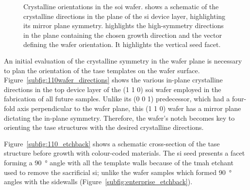 \begin{figure}
{
    }
    \caption[Crystalline orientations in the \hkl(1 1 0) \acs{soi} wafer.] {Crystalline orientations in the \hkl[1 1 0] \acs{soi} wafer.  shows a schematic of the crystalline directions in the plane of the \acs{si} device layer, highlighting its mirror plane symmetry.  highlights the high-symmetry directions in the  plane containing the chosen  growth direction and the \hkl[1 1 0] vector defining the wafer orientation. It highlights the vertical  seed facet.}
    \label{fig:110_wafer_properties}
\end{figure}

An initial evaluation of the crystalline symmetry in the wafer plane is necessary to plan the orientation of the \acs{tase} templates on the wafer surface. Figure~\ref{subfig:110wafer_directions} shows the various in-plane crystalline directions in the top device layer of the \hkl(1 1 0) \acs{soi} wafer employed in the fabrication of all future samples. Unlike its \hkl(0 0 1) predecessor, which had a four-fold axis perpendicular to the wafer plane, this \hkl(1 1 0) wafer has a mirror plane dictating the in-plane symmetry. Therefore, the wafer's notch becomes key to orienting the \acs{tase} structures with the desired crystalline directions.
\par
Figure~\ref{subfig:110_etchback} shows a schematic cross-section of the \acs{tase} structure before growth with colour-coded materials. The \acs{si} seed presents a  facet forming a \qty{90}{\degree} angle with all the template walls because of the \acs{tmah} etchant used to remove the sacrificial \acl{si}; unlike the  wafer samples which formed \qty{90}{\degree} angles with the sidewalls (Figure~\ref{subfig:enterprise_etchback}).

